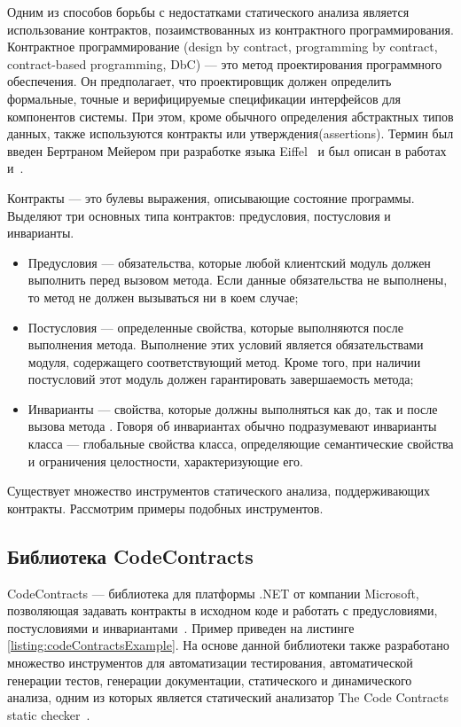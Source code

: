 Одним из способов борьбы с недостатками статического анализа является использование контрактов, позаимствованных из контрактного программирования. Контрактное программирование (design by contract, programming by contract, contract-based programming, DbC) --- это метод проектирования программного обеспечения. Он предполагает, что проектировщик должен определить формальные, точные и верифицируемые спецификации интерфейсов для компонентов системы. При этом, кроме обычного определения абстрактных типов данных, также используются контракты или утверждения(assertions). Термин был введен Бертраном Мейером при разработке языка Eiffel~\cite{eiffel} и был описан в работах~\cite{designByContract} и~\cite{oosc-meyer}.

Контракты --- это булевы выражения, описывающие состояние программы. Выделяют три основных типа контрактов: предусловия, постусловия и инварианты.
\begin{itemize}
\item Предусловия --- обязательства, которые любой клиентский модуль должен выполнить перед вызовом метода. Если данные обязательства не выполнены, то метод не должен вызываться ни в коем случае;

\item Постусловия --- определенные свойства, которые выполняются после выполнения метода. Выполнение этих условий является обязательствами модуля, содержащего соответствующий метод. Кроме того, при наличии постусловий этот модуль должен гарантировать завершаемость метода;

\item Инварианты --- свойства, которые должны выполняться как до, так и после вызова метода . Говоря об инвариантах обычно подразумевают инварианты класса --- глобальные свойства класса, определяющие семантические свойства и ограничения целостности, характеризующие его.
\end{itemize}

Существует множество инструментов статического анализа, поддерживающих контракты. Рассмотрим примеры подобных инструментов.

\subsection{Библиотека CodeContracts}
CodeContracts --- библиотека для платформы .NET от компании Microsoft, позволяющая задавать контракты в исходном коде и работать с предусловиями, постусловиями и инвариантами~\cite{codeContracts}. Пример приведен на листинге \ref{listing:codeContractsExample}. На основе данной библиотеки также разработано множество инструментов для автоматизации тестирования, автоматической генерации тестов, генерации документации, статического и динамического анализа, одним из которых является статический анализатор The Code Contracts static checker~\cite{cccheck}.



